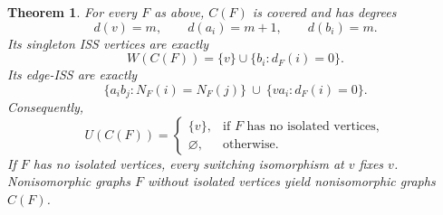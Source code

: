 \documentclass[11pt]{article}
\newtheorem{theorem}{Theorem}
\begin{document}
\begin{theorem}\label{construction}
For every $F$ as above, $C(F)$ is covered and has degrees
\[
 d(v)=m,\qquad d(a_i)=m+1,\qquad d(b_i)=m.
\]
Its singleton ISS vertices are exactly
\begin{equation}\label{familyW}
 W(C(F))=\{v\}\cup\{b_i:d_F(i)=0\}.
\end{equation}
Its edge-ISS are exactly
\begin{equation}\label{familyP}
 \{a_i b_j:N_F(i)=N_F(j)\}
 \ \cup\ \{v a_i:d_F(i)=0\}.
\end{equation}
Consequently,
\[
 U(C(F))=
 \begin{cases}
 \{v\},&\text{if $F$ has no isolated vertices},\\
 \varnothing,&\text{otherwise}.
 \end{cases}
\]
If $F$ has no isolated vertices, every switching isomorphism at $v$
fixes $v$. Nonisomorphic graphs $F$ without isolated vertices yield
nonisomorphic graphs $C(F)$.
\end{theorem}
\end{document}
